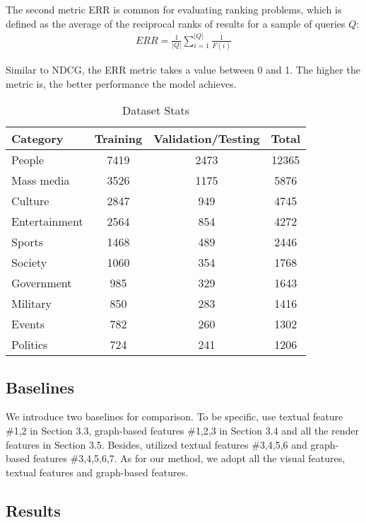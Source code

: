 The second metric ERR is common for evaluating ranking problems, which is defined as the average of the reciprocal ranks of results for a sample of queries $Q$:
\begin{align*}
    ERR = \frac{1}{|Q|} \sum_{i=1}^{|Q|} \frac{1}{F(i)}
\end{align*}

Similar to NDCG, the ERR metric takes a value between 0 and 1. The higher the metric is, the better performance the model achieves.

\begin{table}[t]
\centering
\begin{tabular}{|l|c|c|c|}
\hline
Category & Training & Validation/Testing & Total \\
\hline
People & 7419 & 2473 & 12365\\
\hline
Mass media & 3526 & 1175 & 5876 \\
\hline
Culture & 2847 & 949 & 4745 \\
\hline
Entertainment & 2564 & 854 & 4272 \\
\hline
Sports & 1468 & 489 & 2446 \\
\hline
Society & 1060 & 354 & 1768 \\
\hline
Government & 985 & 329 & 1643 \\
\hline
Military & 850 & 283 & 1416 \\
\hline
Events & 782 & 260 & 1302 \\
\hline
Politics & 724 & 241 & 1206 \\
\hline

\end{tabular}
\caption{Dataset Stats}
\label{table_partition}
\end{table}

\subsection{Baselines}

We introduce two baselines \cite{thruesen2016link, dimitrov2017makes} for comparison. To be specific, \cite{dimitrov2017makes} use textual feature \#1,2 in Section 3.3, graph-based features \#1,2,3 in Section 3.4 and all the render features in Section 3.5. Besides, \cite{dimitrov2017makes} utilized  textual features \#3,4,5,6 and graph-based features \#3,4,5,6,7. As for our method, we adopt all the visual features, textual features and graph-based features.

\subsection{Results}

